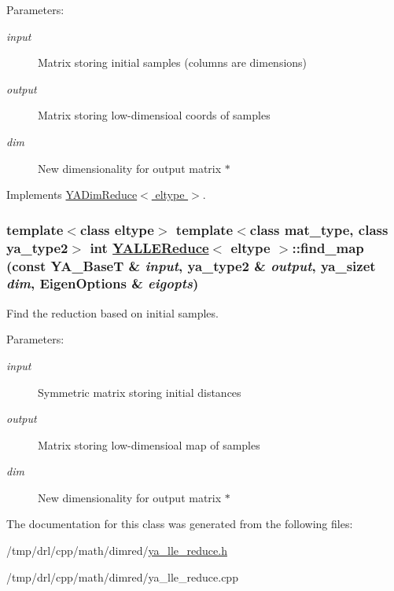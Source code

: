 \begin{Desc}
\item[Parameters:]
\begin{description}
\item[{\em input}]Matrix storing initial samples (columns are dimensions) \item[{\em output}]Matrix storing low-dimensioal coords of samples \item[{\em dim}]New dimensionality for output matrix $\ast$ \end{description}
\end{Desc}


Implements \hyperlink{class_y_a_dim_reduce_a8}{YADim\-Reduce$<$ eltype $>$}.\hypertarget{class_y_a_l_l_e_reduce_a5}{
\subsubsection[find\_\-map]{\setlength{\rightskip}{0pt plus 5cm}template$<$class eltype$>$ template$<$class mat\_\-type, class ya\_\-type2$>$ int \hyperlink{class_y_a_l_l_e_reduce}{YALLEReduce}$<$ eltype $>$::find\_\-map (const YA\_\-Base\-T \& {\em input}, ya\_\-type2 \& {\em output}, ya\_\-sizet {\em dim}, Eigen\-Options \& {\em eigopts})}}
\label{class_y_a_l_l_e_reduce_a5}


Find the reduction based on initial samples. 

\begin{Desc}
\item[Parameters:]
\begin{description}
\item[{\em input}]Symmetric matrix storing initial distances \item[{\em output}]Matrix storing low-dimensioal map of samples \item[{\em dim}]New dimensionality for output matrix $\ast$ \end{description}
\end{Desc}


The documentation for this class was generated from the following files:\begin{CompactItemize}
\item 
/tmp/drl/cpp/math/dimred/\hyperlink{ya__lle__reduce_8h}{ya\_\-lle\_\-reduce.h}\item 
/tmp/drl/cpp/math/dimred/ya\_\-lle\_\-reduce.cpp\end{CompactItemize}
